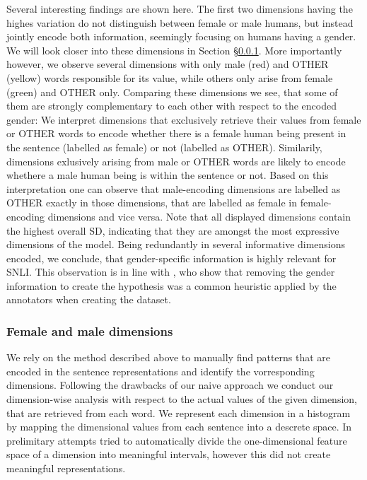 Several interesting findings are shown here. The first two dimensions having the highes variation do not distinguish between female or male humans, but instead jointly encode both information, seemingly focusing on humans having a gender. We will look closer into these dimensions in Section §\ref{sec:understanding2}. More importantly however, we observe several dimensions with only male (red) and OTHER (yellow) words responsible for its value, while others only arise from female (green) and OTHER only. Comparing these dimensions we see, that some of them are strongly complementary to each other with respect to the encoded gender: We interpret dimensions that exclusively retrieve their values from female or OTHER words to encode whether there is a female human being present in the sentence (labelled as female) or not (labelled as OTHER). Similarily, dimensions exlusively arising from male or OTHER words are likely to encode whethere a male human being is within the sentence or not. Based on this interpretation one can observe that male-encoding dimensions are labelled as OTHER exactly in those dimensions, that are labelled as female in female-encoding dimensions and vice versa. Note that all displayed dimensions contain the highest overall \ac{SD}, indicating that they are amongst the most expressive dimensions of the model. Being redundantly in several informative dimensions encoded, we conclude, that gender-specific information is highly relevant for \ac{SNLI}. This observation is in line with \cite{gururangan2018annotation}, who show that removing the gender information to create the hypothesis was a common heuristic applied by the annotators when creating the dataset.

\subsubsection{Female and male dimensions}\label{sec:understanding2}
We rely on the method described above to manually find patterns that are encoded in the sentence representations and identify the vorresponding dimensions. Following the drawbacks of our naive approach we conduct our dimension-wise analysis with respect to the actual values of the given dimension, that are retrieved from each word. We represent each dimension in a histogram by mapping the dimensional values from each sentence into a descrete space. In prelimitary attempts tried to automatically divide the one-dimensional feature space of a dimension into meaningful intervals, however this did not create meaningful representations. 
